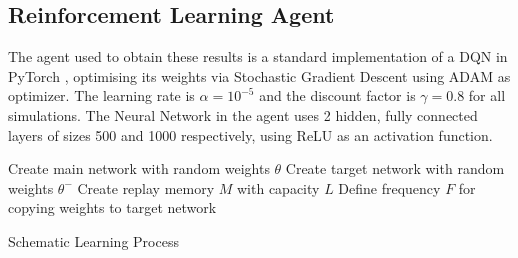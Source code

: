 \documentclass[a4paper, conference]{IEEEtran}
\begin{document}
\subsection{Reinforcement Learning Agent}
The agent used to obtain these results is a standard implementation of a DQN in PyTorch \cite{pytorch}, optimising its weights via Stochastic Gradient Descent \cite{kiefer} using ADAM \cite{adam} as optimizer.
The learning rate is $\alpha=10^{-5}$ and the discount factor is $\gamma = 0.8$ for all simulations.
The Neural Network in the agent uses 2 hidden, fully connected layers of sizes 500 and 1000 respectively, using ReLU as an activation function.
\begin{algorithm}
\SetAlgoLined
 Create main network with random weights $\theta$\;
 Create target network with random weights $\theta^-$\;
 Create replay memory $M$ with capacity $L$\;
 Define frequency $F$ for copying weights to target network\;
 \caption{Schematic Learning Process}

\end{algorithm}
\end{document}
